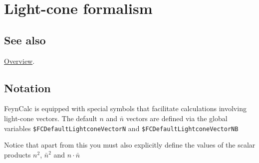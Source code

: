 \documentclass[../FeynCalcManual.tex]{subfiles}
\begin{document}
\begin{Shaded}
\begin{Highlighting}[]
 
\end{Highlighting}
\end{Shaded}

\hypertarget{light-cone formalism}{
\section{Light-cone formalism}\label{light-cone formalism}}

\subsection{See also}

\hyperlink{toc}{Overview}.

\hypertarget{notation}{%
\subsection{Notation}\label{notation}}

FeynCalc is equipped with special symbols that facilitate calculations
involving light-cone vectors. The default \(n\) and \(\bar{n}\) vectors
are defined via the global variables
\texttt{\$FCDefaultLightconeVectorN} and
\texttt{\$FCDefaultLightconeVectorNB}

\begin{Shaded}
\begin{Highlighting}[]
\ExtensionTok{=} \NormalTok{;}
\ExtensionTok{=}
\end{Highlighting}
\end{Shaded}

Notice that apart from this you must also explicitly define the values
of the scalar products \(n^2\), \(\bar{n}^2\) and \(n \cdot \bar{n}\)

\begin{Shaded}
\begin{Highlighting}[]
\OperatorTok{[]}
\OperatorTok{[}\OperatorTok{]} \ExtensionTok{=} \NormalTok{;}
\OperatorTok{[}\OperatorTok{]} \ExtensionTok{=} \NormalTok{;}
\OperatorTok{[}\OperatorTok{,}\OperatorTok{]} \ExtensionTok{=} \NormalTok{;}
\end{Highlighting}
\end{Shaded}
\end{document}
